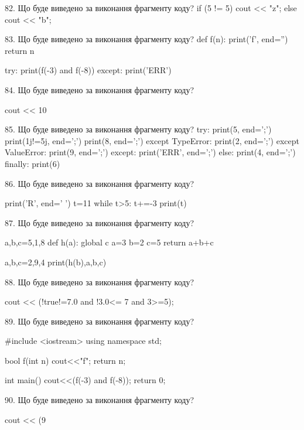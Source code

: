 \documentclass[11pt]{article}
\begin{document}

82. Що буде виведено за виконання фрагменту коду?
if (5 != 5)
    cout << "z";
else
    cout << "b";



83. Що буде виведено за виконання фрагменту коду?
def f(n):
    print('f', end='')
    return n

try:
    print(f(-3) and f(-8))
except:
    print('ERR')


84. Що буде виведено за виконання фрагменту коду?

cout << 10 %


85. Що буде виведено за виконання фрагменту коду?
try:
    print(5, end=';')
    print(1j!=5j, end=';')
    print(8, end=';')
except TypeError:
    print(2, end=';')
except ValueError:
    print(9, end=';')
except:
    print('ERR', end=';')
else:
    print(4, end=';')
finally:
    print(6)


86. Що буде виведено за виконання фрагменту коду?

print('R', end=' ')
t=11
while t>5:
    t+=-3
print(t)



87. Що буде виведено за виконання фрагменту коду?

a,b,c=5,1,8
def h(a):
global c    a=3
    b=2
    c=5
    return a+b+c

a,b,c=2,9,4
print(h(b),a,b,c)


88. Що буде виведено за виконання фрагменту коду?

cout << (!true!=7.0 and !3.0<= 7 and 3>=5);


89. Що буде виведено за виконання фрагменту коду?

#include <iostream>
using namespace std;

bool f(int n){
    cout<<"f";
    return n;
}

int main(){
    cout<<(f(-3) and f(-8));
    return 0;
}


90. Що буде виведено за виконання фрагменту коду?

cout << (9 %
\end{document}
